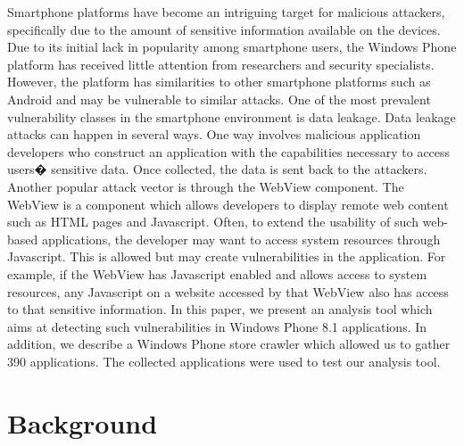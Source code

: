\documentclass[conference]{IEEEtran}
\begin{document}
Smartphone platforms have become an intriguing target for malicious attackers, specifically due to the amount of sensitive information available on the devices.
Due to its initial lack in popularity among smartphone users, the Windows Phone platform has received little attention from researchers and security specialists. 
However, the platform has similarities to other smartphone platforms such as Android and may be vulnerable to similar attacks. 
One of the most prevalent vulnerability classes in the smartphone environment is data leakage. 
Data leakage attacks can happen in several ways. 
One way involves malicious application developers who construct an application with the capabilities necessary to access users� sensitive data.
Once collected, the data is sent back to the attackers.
Another popular attack vector is through the WebView component. 
The WebView is a component which allows developers to display remote web content such as HTML pages and Javascript. 
Often, to extend the usability of such web-based applications, the developer may want to access system resources through Javascript.
This is allowed but may create vulnerabilities in the application.
For example, if the WebView has Javascript enabled and allows access to system resources, any Javascript on a website accessed by that WebView also has access to that sensitive information. 
In this paper, we present an analysis tool which aims at detecting such vulnerabilities in Windows Phone 8.1 applications.
In addition, we describe a Windows Phone store crawler which allowed us to gather 390 applications.
The collected applications were used to test our analysis tool.

\section{Background}
\end{document}
